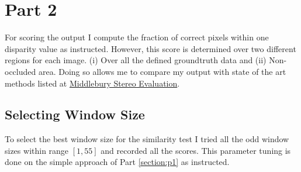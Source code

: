 \documentclass[letterpaper,12pt]{article}
\begin{document}
\section{Part 2}
For scoring the output I compute the fraction of correct pixels within one disparity value as instructed. However, this score is determined over two different regions for each image. (i) Over all the defined groundtruth data and (ii) Non-occluded area. Doing so allows me to compare my output with state of the art methods listed at \href{http://vision.middlebury.edu/stereo/}{Middlebury Stereo Evaluation}.

\subsection{Selecting Window Size}
	To select the best window size for the similarity test I tried all the odd window sizes within range $[1, 55]$ and recorded all the scores. This parameter tuning is done on the simple approach of Part \ref{section:p1} as instructed.
	
\end{document}
